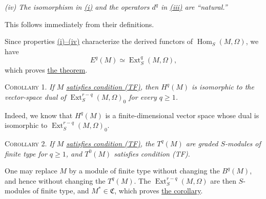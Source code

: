 \label{fac:III:4:no:72:property:iv}
\textit{(iv) The isomorphism in
\hyperref[fac:III:4:no:72:property:i]{(i)} and the operators $d^q$ in
\hyperref[fac:III:4:no:72:property:iii]{(iii)}
are ``natural.''}

This follows immediately from their definitions.

Since properties
\hyperref[fac:III:4:no:72:properties]{(i)--(iv)} characterize the derived
functors of
$\operatorname{Hom}_S(M,\Omega)$, we have
\label{fac:III:4:no:72:formula:E-Ext}
\[
E^q(M)\simeq\operatorname{Ext}_S^q(M,\Omega),
\]
which proves \hyperref[fac:III:4:no:72:thm:1]{the theorem}.

\label{fac:III:4:no:72:cor:1}
\textsc{Corollary 1.} \textit{If $M$
\hyperref[fac:III:2:no:56:def:TF]{satisfies condition (TF)}, then
$H^q(M)$ is isomorphic to the vector-space dual of
$\operatorname{Ext}_S^{r-q}(M,\Omega)_0$ for every $q\geq1$.}

Indeed, we know that $H^q(M)$ is a finite-dimensional vector space
whose dual is isomorphic to $\operatorname{Ext}_S^{r-q}(M,\Omega)_0$.

\label{fac:III:4:no:72:cor:2}
\textsc{Corollary 2.} \textit{If $M$
\hyperref[fac:III:2:no:56:def:TF]{satisfies condition (TF)}, the
$T^q(M)$ are graded $S$-modules of finite type for $q\geq1$, and
$T^0(M)$ satisfies condition (TF).}

One may replace $M$ by a module of finite type without changing the
$B^q(M)$, and hence without changing the $T^q(M)$. The
$\operatorname{Ext}_S^{r-q}(M,\Omega)$ are then $S$-modules of finite
type, and $M^*\in\mathfrak{C}$, which proves
\hyperref[fac:III:4:no:72:cor:2]{the corollary}.
